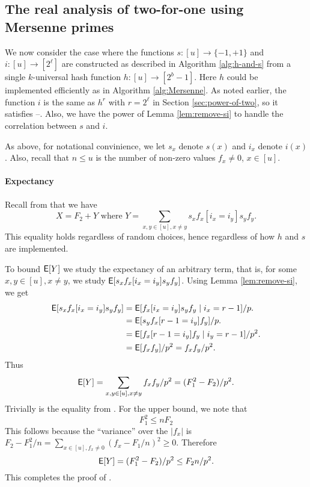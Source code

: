 \subsection{The real analysis of two-for-one using Mersenne primes}
We now consider the case where the functions $s:[u]\to\{-1,+1\}$ and
$i:[u]\to[2^\ell]$ are constructed as described in Algorithm
\ref{alg:h-and-s} from a single $k$-universal hash function
$h:[u]\to[2^b-1]$. Here $h$ could be implemented efficiently as
in Algorithm \ref{alg:Mersenne}. As noted earlier, the function
$i$ is the same as $h^r$ with $r=2^\ell$ in Section \ref{sec:power-of-two},
so it satisfies --. Also, we
have the power of Lemma \ref{lem:remove-si} to handle the correlation
between $s$ and $i$.

As above, for notational convinience, we let $s_x$ denote $s(x)$ and $i_x$ denote $i(x)$. Also, recall that $n\leq u$ is the number of non-zero values
$f_x\neq 0$, $x\in [u]$.



\paragraph{Expectancy}
Recall from  that
we have
\[X=F_2+Y\mbox{ where }Y=\sum_{x,y\in[u],x\neq y} s_x f_x[i_x=i_y]s_y f_y.\]
This equality holds regardless of random choices, hence regardless of
how $h$ and $s$ are implemented.

To bound $\operatorname*{\sf{E}}[Y]$ we study the expectancy of an arbitrary term, that is,
for some $x,y\in[u],x\neq y$, we study $\operatorname*{\sf{E}}[ s_x f_x[i_x=i_y]s_y f_y]$.
Using Lemma \ref{lem:remove-si}, we get 
\begin{align}
\E[s_x f_x[i_x=i_y]s_y f_y]&=\E[f_x[i_x=i_y]s_y f_y\suchthat i_x=r-1]/p.\nonumber\\
&=\E[s_y f_x[r-1=i_y]f_y]/p.\nonumber\\
&=\E[f_x[r-1=i_y]f_y\suchthat i_y=r-1]/p^2.\nonumber\\
&=\E[f_xf_y]/p^2=f_x f_y/p^2.\label{eq:E}
\end{align}
Thus
\[\operatorname*{\sf{E}}[Y]=\sum_{x,y\in[u],x\neq y} f_xf_y/p^2=(F_1^2-F_2)/p^2.\]
Trivially is the equality from . For the upper bound, we note that 
\begin{equation}\label{eq:F1F2}
F_1^2\leq nF_2 
\end{equation}
This follows because the ``variance'' over the $|f_x|$ is
$F_2-F_1^2/n=\sum_{x\in[u], f_x\neq 0}(f_x-F_1/n)^2\geq 0$.
Therefore
\[\operatorname*{\sf{E}}[Y]=(F_1^2-F_2)/p^2\leq F_2n/p^2.\]
This completes the proof of .

